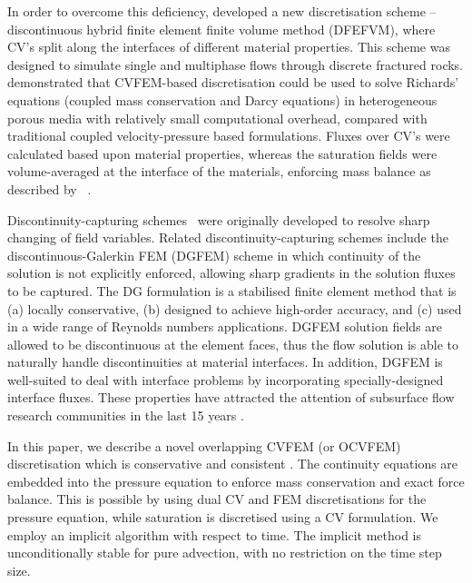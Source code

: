 \documentclass[preprint,authoryear,12pt]{elsarticle}
\begin{document}
In order to overcome this deficiency, \citet{nick_2011b, nick_2011a} developed a new discretisation scheme -- discontinuous hybrid finite element finite volume method (DFEFVM), where CV's split along the interfaces of different material properties. This scheme was designed to simulate single and multiphase flows through discrete fractured rocks. \citet{cumming_2011} demonstrated that CVFEM-based discretisation could be used to solve Richards' equations (coupled mass conservation and Darcy equations) in heterogeneous porous media with relatively small computational overhead, compared with traditional coupled velocity-pressure based formulations. Fluxes over CV's were calculated based upon material properties, whereas the saturation fields were volume-averaged at the interface of the materials, enforcing mass balance as described by \citet{kirkland_1992}~\citep[see also][]{forsyth_1990,cumming_phd2012}.

Discontinuity-capturing schemes~\citep[e.g., shock waves, contact surface or material discontinuity -- see][]{brooks_1982,tezduyar_1986,toro_1997} were originally developed to resolve sharp changing of field variables. Related discontinuity-capturing schemes include the discontinuous-Galerkin FEM (DGFEM) scheme in which continuity of the solution is not explicitly enforced, allowing sharp gradients in the solution fluxes to be captured. The DG formulation is a stabilised finite element method that is (a) locally conservative, (b) designed to achieve high-order accuracy, and (c) used in a wide range of Reynolds numbers applications. DGFEM solution fields are allowed to be discontinuous at the element faces, thus the flow solution is able to naturally handle discontinuities at material interfaces. In addition, DGFEM is well-suited to deal with interface problems by incorporating specially-designed interface fluxes. These properties have attracted the attention of subsurface flow research communities in the last 15 years \citep[see][]{riviere_2000,riviere_2002,bastian_2002}.

\medskip 

In this paper, we describe a novel overlapping CVFEM (or OCVFEM) discretisation which is conservative and consistent \citep{jackson_2013}. The continuity equations are embedded into the pressure equation to enforce mass conservation and exact force balance. This is possible by using dual CV and FEM discretisations for the pressure equation, while saturation is discretised using a CV formulation. We employ an implicit algorithm with respect to time. The implicit method is unconditionally stable for pure advection, with no restriction on the time step size.
\end{document}
